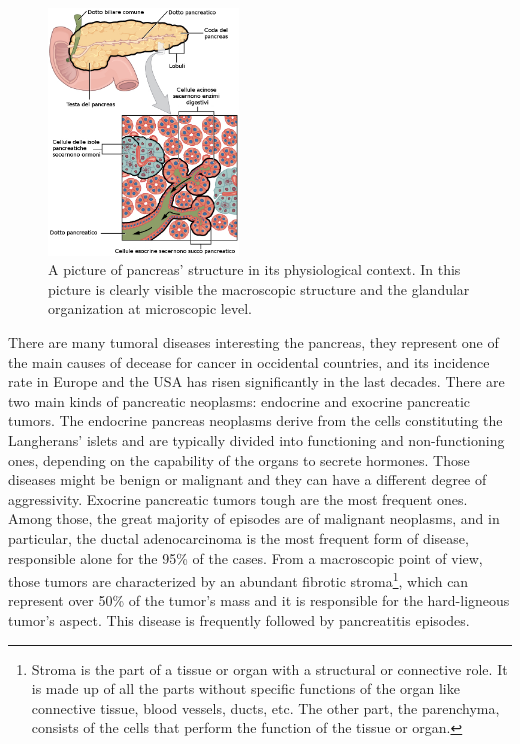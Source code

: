      \begin{figure}
         \centering
         \includegraphics[width = 0.45\textwidth]{images/pancr_struct_zoom}
         \caption{A picture of pancreas' structure in its physiological context. In this picture is clearly visible the macroscopic structure and the glandular organization at microscopic level.}
         \label{fig:panc_struct}
     \end{figure}

    There are many tumoral diseases interesting the pancreas, they represent one of the main causes of decease for cancer in occidental countries, and its incidence rate in Europe and the USA has risen significantly in the last decades. There are two main kinds of pancreatic neoplasms: endocrine and exocrine pancreatic tumors. The endocrine pancreas neoplasms derive from the cells constituting the Langherans' islets and are typically divided into functioning and non-functioning ones, depending on the capability of the organs to secrete hormones. Those diseases might be benign or malignant and they can have a different degree of aggressivity. Exocrine pancreatic tumors tough are the most frequent ones. Among those, the great majority of episodes are of malignant neoplasms, and in particular, the ductal adenocarcinoma is the most frequent form of disease, responsible alone for the 95\% of the cases. From a macroscopic point of view, those tumors are characterized by an abundant fibrotic stroma\footnote{Stroma is the part of a tissue or organ with a structural or connective role. It is made up of all the parts without specific functions of the organ like connective tissue, blood vessels, ducts, etc. The other part, the parenchyma, consists of the cells that perform the function of the tissue or organ.}, which can represent over 50\% of the tumor's mass and it is responsible for the hard-ligneous tumor's aspect. This disease is frequently followed by pancreatitis episodes.

